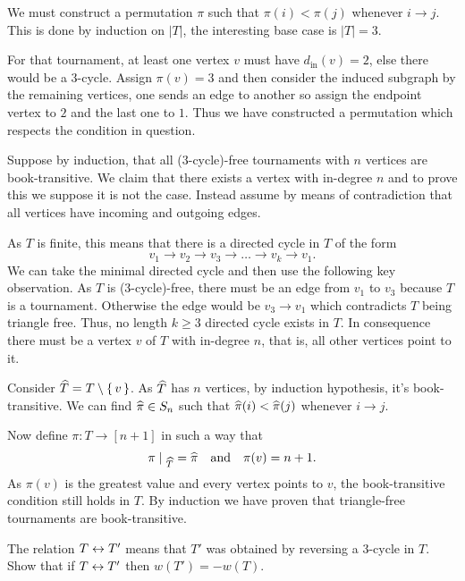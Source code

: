 \documentclass[12pt]{memoir}
\begin{document}
\begin{ptcbr}
    We must construct a permutation $\pi$ such that $\pi(i)<\pi(j)$ whenever $i\to j$. This is done by induction on $|T|$, the interesting base case is $|T|=3$.\par 
    For that tournament, at least one vertex $v$ must have $d_{\text{in}}(v)=2$, else there would be a 3-cycle. Assign $\pi(v)=3$ and then consider the induced subgraph by the remaining vertices, one sends an edge to another so assign the endpoint vertex to $2$ and the last one to $1$. Thus we have constructed a permutation which respects the condition in question.\par 
    Suppose by induction, that all (3-cycle)-free tournaments with $n$ vertices are book-transitive. We claim that there exists a vertex with in-degree $n$ and to prove this we suppose it is not the case. Instead assume by means of contradiction that all vertices have incoming and outgoing edges.\par 
    As $T$ is finite, this means that there is a directed cycle in $T$ of the form 
    $$v_1\to v_2\to v_3\to\dots\to v_k\to v_1.$$
    We can take the minimal directed cycle and then use the following key observation. As $T$ is (3-cycle)-free, there must be an edge from $v_1$ to $v_3$ because $T$ is a tournament. Otherwise the edge would be $v_3\to v_1$ which contradicts $T$ being triangle free. Thus, no length $k\geq 3$ directed cycle exists in $T$. In consequence there must be a vertex $v$ of $T$ with in-degree $n$, that is, all other vertices point to it.\par 
    Consider $\widehat{T}=T\setminus\{\,v\,\}$. As $\widehat{T}$ has $n$ vertices, by induction hypothesis, it's book-transitive. We can find $\widehat{\pi}\in S_n$ such that $\widehat{\pi}(i)<\widehat{\pi}(j)$ whenever $i\to j$.\par 
    Now define $\pi:T\to[n+1]$ in such a way that 
    $$\pi\mid_{\wh{T}}=\wh{\pi}\word{and}\pi(v)=n+1.$$
    As $\pi(v)$ is the greatest value and every vertex points to $v$, the book-transitive condition still holds in $T$. By induction we have proven that triangle-free tournaments are book-transitive.
\end{ptcbr}

\begin{Ej}
The relation $T\leftrightarrow T'$ means that $T'$ was obtained by reversing a 3-cycle in $T$. Show that if $T\leftrightarrow T'$ then $w(T')=-w(T)$. 
\end{Ej}
\end{document}
